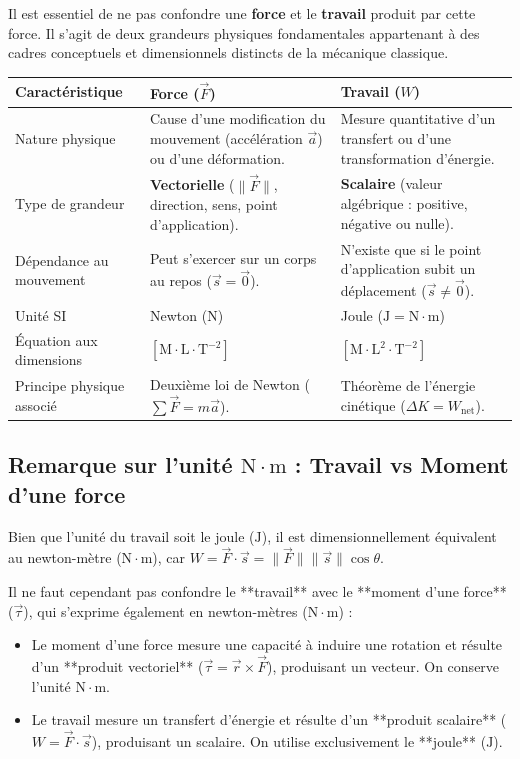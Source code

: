 \documentclass[11pt,openany]{book}
\begin{document}
Il est essentiel de ne pas confondre une \textbf{force} et le \textbf{travail} produit par cette force. Il s'agit de deux grandeurs physiques fondamentales appartenant à des cadres conceptuels et dimensionnels distincts de la mécanique classique.

\begin{center}
\renewcommand{\arraystretch}{1.3}
\begin{tabular}{p{3.5cm}p{5.5cm}p{5.5cm}}
\hline
\textbf{Caractéristique} & \textbf{Force ($\vec{F}$)} & \textbf{Travail ($W$)} \\
\hline
Nature physique & Cause d'une modification du mouvement (accélération $\vec{a}$) ou d'une déformation. & Mesure quantitative d'un transfert ou d'une transformation d'énergie. \\
Type de grandeur & \textbf{Vectorielle} ($\|\vec{F}\|$, direction, sens, point d'application). & \textbf{Scalaire} (valeur algébrique : positive, négative ou nulle). \\
Dépendance au mouvement & Peut s'exercer sur un corps au repos ($\vec{s} = \vec{0}$). & N'existe que si le point d'application subit un déplacement ($\vec{s} \neq \vec{0}$). \\
Unité SI & Newton ($\mathrm{N}$) & Joule ($\mathrm{J} = \mathrm{N \cdot m}$) \\
Équation aux dimensions & $[\mathrm{M \cdot L \cdot T^{-2}}]$ & $[\mathrm{M \cdot L^2 \cdot T^{-2}}]$ \\
Principe physique associé & Deuxième loi de Newton ($\sum \vec{F} = m\vec{a}$). & Théorème de l'énergie cinétique ($\Delta K = W_{\text{net}}$). \\
\hline
\end{tabular}
\end{center}

\subsection*{Remarque sur l'unité $\mathrm{N \cdot m}$ : Travail vs Moment d'une force}

Bien que l'unité du travail soit le joule ($\mathrm{J}$), il est dimensionnellement équivalent au newton-mètre ($\mathrm{N \cdot m}$), car $W = \vec{F} \cdot \vec{s} = \|\vec{F}\| \|\vec{s}\| \cos\theta$. 

Il ne faut cependant pas confondre le **travail** avec le **moment d'une force** ($\vec{\tau}$), qui s'exprime également en newton-mètres ($\mathrm{N \cdot m}$) :
\begin{itemize}
    \item Le moment d'une force mesure une capacité à induire une rotation et résulte d'un **produit vectoriel** ($\vec{\tau} = \vec{r} \times \vec{F}$), produisant un vecteur. On conserve l'unité $\mathrm{N \cdot m}$.
    \item Le travail mesure un transfert d'énergie et résulte d'un **produit scalaire** ($W = \vec{F} \cdot \vec{s}$), produisant un scalaire. On utilise exclusivement le **joule** ($\mathrm{J}$).
\end{itemize}
\end{document}
